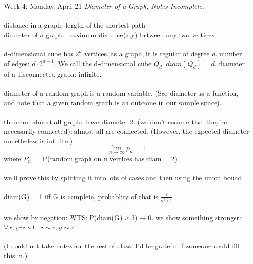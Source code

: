 \documentclass[12pt]{article}
\theoremstyle{remark}
\newcommand{\st}{\text{ s.t. }}
\begin{document}
\newpage
\label{10}\begin{section}{Week 4: Monday, April 21}
\indent\textit{Diameter of a Graph, Notes Incomplete.}\\\\
distance in a graph: length of the shortest path
\\diameter of a graph: maximum distance(x,y) between any two vertices
\\\\d-dimensional cube has $2^d$ vertices. as a graph, it is regular of degree $d$. number of edges: $d \cdot 2^{d-1}$. We call the d-dimensional cube $Q_d$. $diam(Q_d) = d$. diameter of a disconnected graph: infinite. 
\\\\
diameter of a random graph is a random variable. (See diameter as a function, and note that a given random graph is an outcome in our sample space).
\\\\theorem: almost all graphs have diameter 2. (we don't assume that they're necessarily connected): almost all are connected.
(However, the expected diameter nonetheless is infinite.)
$$\lim_{n \to \infty} p_n = 1$$ where $P_n =$ P(random graph on n vertices has diam = 2)
\\\\
we'll prove this by splitting it into lots of cases and then using the union bound 
\\\\ diam(G) = 1 iff G is complete, probablity of that is $\frac1 {2 ^{n \choose 2}}$
\\\\we show by negation: WTS: P(diam(G)$\geq 3) \to 0$. we show something stronger: $\forall x,y \exists z \st x \sim z, y\sim z$.
\\\\
(I could not take notes for the rest of class. I'd be grateful if someone could fill this in.)
\end{section}
\newpage
\end{document}
